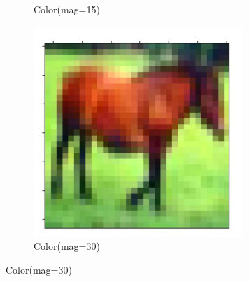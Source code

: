 \documentclass[onecolumn]{ujarticle}   %
\begin{document}
\begin{figure}[h]
\begin{subfigure}{0.3\columnwidth}
        \caption{Color(mag=15)}
        \label{fig:Color_15}
      \end{subfigure}
      \begin{subfigure}{0.3\columnwidth}
        \centering
        \includegraphics[width=1.0\columnwidth]{transform_test/Color_30.png}
        \caption{Color(mag=30)}
        \label{fig:Color_30}
      \end{subfigure}



\end{figure}
\end{document}
